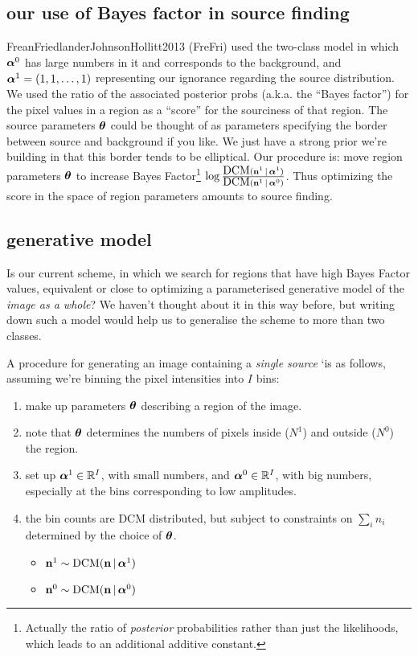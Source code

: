 \documentclass[12pt]{article}
\begin{document}
\subsection{our use of Bayes factor in source finding} 
FreanFriedlanderJohnsonHollitt2013 ({\sc FreFri}) used the two-class model in
which $\boldsymbol\alpha^0$ has large numbers in it and corresponds to the
background, and $\boldsymbol\alpha^1 = (1,1,\ldots,1)$ representing our
ignorance regarding the source distribution. We used the ratio of the
associated posterior probs (a.k.a. the ``Bayes factor'') for the pixel
values in a region as a ``score'' for the sourciness of that
region. The source parameters $\boldsymbol\theta$ could be thought of as
parameters specifying the border between source and background if you
like. We just have a strong prior we're building in that this border
tends to be elliptical.  Our procedure is: move region parameters
$\boldsymbol\theta$ to increase Bayes Factor\footnote{Actually the ratio of
  \emph{posterior} probabilities rather than just the likelihoods,
  which leads to an additional additive constant.} $\log
\frac{\mbox{DCM}(\mathbf{n}^1 \,|\, \boldsymbol\alpha^1)}{\mbox{DCM}(\mathbf{n}^1 \,|\,
  \boldsymbol\alpha^0)}$.  Thus optimizing the score in the space of region
parameters amounts to source finding.


\subsection{generative model}
Is our current scheme, in which we search for regions that have high
Bayes Factor values, equivalent or close to optimizing a parameterised
generative model of the \emph{image as a whole}? We haven't thought about it
in this way before, but writing down such a model would help us to
generalise the scheme to more than two classes.

A procedure for generating an image containing a \emph{single source}
`is as follows, assuming we're binning the pixel intensities into $I$ bins:
\begin{enumerate}
\item make up parameters $\boldsymbol\theta$ describing a region of the image.
\item note that $\boldsymbol\theta$ determines the numbers of pixels inside ($N^1$)  and  outside ($N^0$) the region.
\item set up $\boldsymbol\alpha^1 \in \mathbb{R}^I$, with small numbers,
  and $\boldsymbol\alpha^0 \in \mathbb{R}^I$, with big numbers, especially at the bins corresponding to low amplitudes.
\item the bin counts are DCM distributed, but subject to constraints on $\sum_i n_i$ determined by the choice of $\boldsymbol\theta$.
  \begin{itemize}
    \item    $\mathbf{n}^1 \sim \mbox{DCM}(\mathbf{n} \,|\, \boldsymbol\alpha^1)$
    \item $\mathbf{n}^0 \sim \mbox{DCM}(\mathbf{n} \,|\, \boldsymbol\alpha^0)$
  \end{itemize}
\end{enumerate}
\end{document}
